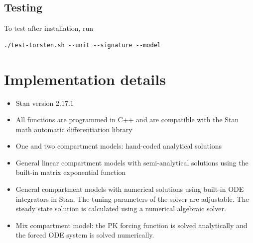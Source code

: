 \documentclass[11pt, reqno]{amsbook}
\numberwithin{section}{chapter}
\theoremstyle{remark}
\begin{document}
\subsection*{Testing}
\label{sec:org4183109}
To test after installation, run
\begin{verbatim}
./test-torsten.sh --unit --signature --model
\end{verbatim}
\section{Implementation details}
\label{sec:org2883d82}
\begin{itemize}
\item Stan version 2.17.1
\item All functions are programmed in C++ and are compatible
with the Stan math automatic differentiation library \cite{carpenter15_stan_math_librar}
\item One and two compartment models: hand-coded analytical solutions
\item General linear compartment models with semi-analytical solutions using the built-in matrix exponential function
\item General compartment models with numerical solutions using built-in ODE integrators in Stan. The tuning parameters of the solver are adjustable. The steady state solution is calculated using a numerical algebraic solver.
\item Mix compartment model: the PK forcing function is solved
analytically and the forced ODE system is solved
numerically.
\end{itemize}
\end{document}
